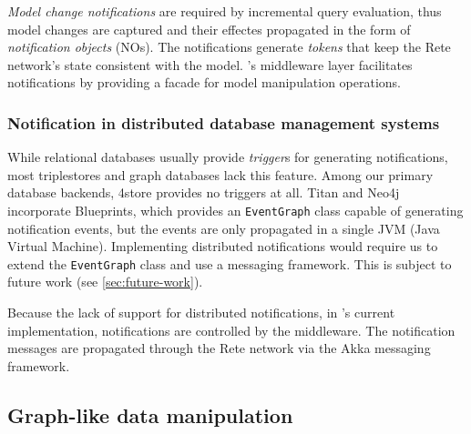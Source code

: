 \emph{Model change notifications} are required by incremental query evaluation, thus model changes are captured and their effectes propagated in the form of \emph{notification objects} (NOs). The notifications generate \emph{tokens} that keep the Rete network's state consistent with the model. \iqd{}'s middleware layer facilitates notifications by providing a facade for model manipulation operations.


\subsubsection{Notification in distributed database management systems}

While relational databases usually provide \emph{trigger}s for generating notifications, most triplestores and graph databases lack this feature. Among our primary database backends, 4store provides no triggers at all. Titan and Neo4j incorporate Blueprints, which provides an \texttt{EventGraph} class capable of generating notification events, but the events are only propagated in a single JVM (Java Virtual Machine). Implementing distributed notifications would require us to extend the \texttt{EventGraph} class and use a messaging framework. This is subject to future work (see \autoref{sec:future-work}). 

Because the lack of support for distributed notifications, in \iqd{}'s current implementation, notifications are controlled by the middleware. The notification messages are propagated through the Rete network via the Akka messaging framework. 




\subsection{Graph-like data manipulation}

